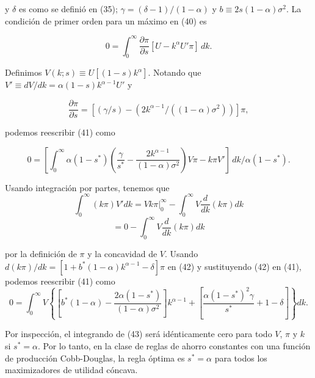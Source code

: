 \documentclass[a4paper,12pt]{article}
\begin{document}
y \( \delta \) es como se definió en (35); \( \gamma = (\delta - 1)/(1 - \alpha) \) y \( b \equiv 2s(1 - \alpha) \sigma^2 \). La condición de primer orden para un máximo en (40) es

		\begin{equation}
0 = \int_0^\infty \frac{\partial \pi}{\partial s} [U - k^\alpha U'\pi] \, dk.
		\end{equation}

Definimos \( V(k; s) \equiv U[(1 - s) k^\alpha] \). Notando que \( V' \equiv dV/dk = \alpha (1 - s) k^{\alpha - 1} U' \) y

		\begin{equation}
\frac{\partial \pi}{\partial s} = \left[ (\gamma / s) - (2k^{\alpha - 1} / ((1 - \alpha) \sigma^2)) \right] \pi,
		\end{equation}

podemos reescribir (41) como

		\begin{equation}
0 = \left[ \int_0^\infty \alpha (1 - s^*) \left( \frac{\gamma}{s^*} - \frac{2k^{\alpha - 1}}{(1 - \alpha) \sigma^2} \right) V \pi - k \pi V' \right] \, dk / \alpha (1 - s^*).
		\end{equation}


Usando integración por partes, tenemos que
		\begin{equation}
\int_0^\infty (k\pi) V' dk = V k\pi \Big|_0^\infty - \int_0^\infty V \frac{d}{dk} (k\pi) dk
		\end{equation}
		\begin{equation}
= 0 - \int_0^\infty V \frac{d}{dk} (k\pi) dk
		\end{equation}

por la definición de $\pi$ y la concavidad de $V$. Usando $d(k\pi)/dk = [1 + b^*(1 - \alpha) k^{\alpha - 1} - \delta] \pi$ en (42) y sustituyendo (42) en (41), podemos reescribir (41) como
		\begin{equation}
0 = \int_0^\infty V \left\{ \left[ b^*(1 - \alpha) - \frac{2\alpha(1 - s^*)}{(1 - \alpha)\sigma^2} \right] k^{\alpha - 1} + \left[ \frac{\alpha(1 - s^*)^2\gamma}{s^*} + 1 - \delta \right] \right\} dk.
		\end{equation}

Por inspección, el integrando de (43) será idénticamente cero para todo $V$, $\pi$ y $k$ si $s^* = \alpha$. Por lo tanto, en la clase de reglas de ahorro constantes con una función de producción Cobb-Douglas, la regla óptima es $s^* = \alpha$ para todos los maximizadores de utilidad cóncava.
\end{document}
